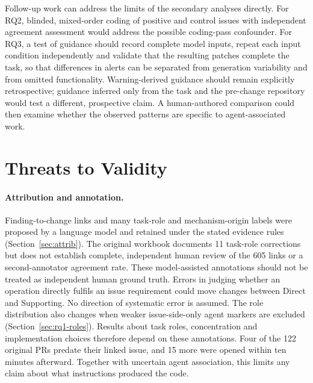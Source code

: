 \documentclass[acmsmall,screen,nonacm]{acmart}
\begin{document}
Follow-up work can address the limits of the secondary analyses directly. For RQ2, blinded, mixed-order coding of positive and control issues with independent agreement assessment would address the possible coding-pass confounder. For RQ3, a test of guidance should record complete model inputs, repeat each input condition independently and validate that the resulting patches complete the task, so that differences in alerts can be separated from generation variability and from omitted functionality. Warning-derived guidance should remain explicitly retrospective; guidance inferred only from the task and the pre-change repository would test a different, prospective claim. A human-authored comparison could then examine whether the observed patterns are specific to agent-associated work.

\section{Threats to Validity}\label{sec:threats}

\paragraph{Attribution and annotation.} Finding-to-change links and many task-role and mechanism-origin labels were proposed by a language model and retained under the stated evidence rules (Section~\ref{sec:attrib}). The original workbook documents 11 task-role corrections but does not establish complete, independent human review of the 605 links or a second-annotator agreement rate. These model-assisted annotations should not be treated as independent human ground truth. Errors in judging whether an operation directly fulfils an issue requirement could move changes between Direct and Supporting. No direction of systematic error is assumed. The role distribution also changes when weaker issue-side-only agent markers are excluded (Section~\ref{sec:rq1-roles}). Results about task roles, concentration and implementation choices therefore depend on these annotations. Four of the 122 original PRs predate their linked issue, and 15 more were opened within ten minutes afterward. Together with uncertain agent association, this limits any claim about what instructions produced the code.
\end{document}
